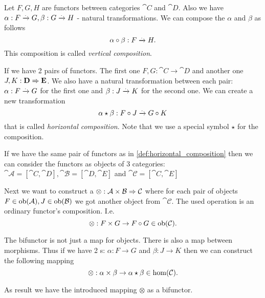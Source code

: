 \begin{definition}
\label{def:vertical_composition}
Let $F,G,H$ are functors between categories $\cat{C}$ and $\cat{D}$.
Also we have $\alpha : F \xrightarrow{.} G, \beta: G \xrightarrow{.}
H$ - natural transformations. We can compose the $\alpha$ and $\beta$
as follows 
\[
\alpha \circ \beta: F \xrightarrow{.} H.
\]
This composition
is called \textit{vertical composition}.
\end{definition}

\begin{definition}
\label{def:horizontal_composition}
If we have 2 pairs of functors. The first one $F,G: \cat{C} \to
\cat{D}$ and another one $J,K: \mathbf{D} \Rightarrow \mathbf{E}$. We also have a
natural transformation between each pair: $\alpha : F \xrightarrow{.}
G$ for the first one and $\beta : J \xrightarrow{.}
K$ for the second one. We can create a new transformation
\[
\alpha \star \beta: F \circ J \xrightarrow{.} G \circ K
\] 
that is called \textit{horizontal composition}. Note that we use a
special symbol $\star$ for the composition.
\end{definition}

\begin{remark}
 \label{rem:bifunctor_fun_cat}
If we have the same pair of functors as in
\cref{def:horizontal_composition} then we can consider the functors as
objects of 3 categories: $\cat{\mathcal{A}} = \left[\cat{C},
  \cat{D}\right], \cat{\mathcal{B}} = \left[\cat{D},
  \cat{E}\right]$ and $\cat{\mathcal{C}} = \left[\cat{C},
  \cat{E}\right]$ 

  Next we want to construct a  
  $\otimes: \mathbf{\mathcal{A}} \times \mathbf{\mathcal{B}} \Rightarrow \mathbf{\mathcal{C}}$
  where for each pair of objects $F \in \mathrm{ob}(\mathbf{\mathcal{A}}), J \in
  \mathrm{ob}(\mathbf{\mathcal{B}})$ we got another object from $\cat{\mathcal{C}}$.
  The used operation is an ordinary functor's composition.
  I.e.
  \[
  \otimes: F \times G \to F \circ G \in \mathrm{ob}(\mathbf{\mathcal{C}}).
  \]
  
  The bifunctor is not just a map for objects. There is also a map
  between morphisms. Thus if we have 2 s:
  $\alpha : F \to G$ and $\beta : J \to K$ then we can construct the
  following mapping 
  \[
  \otimes: \alpha \times \beta \to \alpha \star \beta \in \mathrm{hom}(\mathbf{\mathcal{C}}).
  \]
  
  As result we have the introduced mapping $\otimes$ as a bifunctor.
\end{remark}

